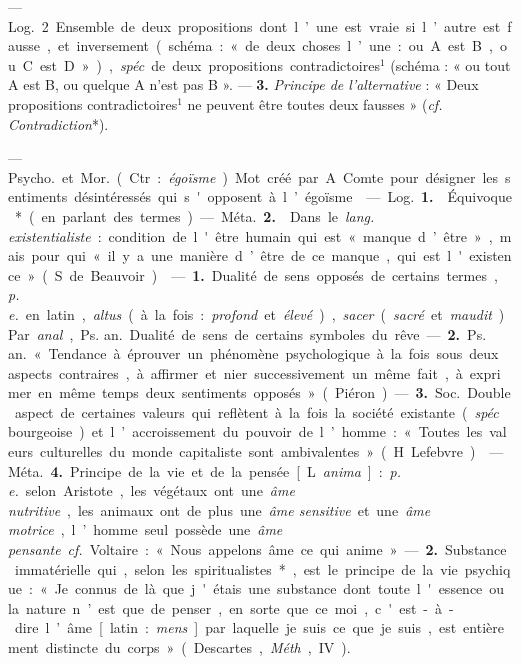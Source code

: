 \begin{itemize}[leftmargin=1cm, label=, itemsep=1pt]
{{— \si{Log.} 2 Ensemble de deux
propositions dont l’une est vraie si
l’autre est fausse, et inversement
(schéma : « de deux choses l’une :
ou A est B, ou C est D »), {\it spéc}. de
deux propositions contradictoires$^1$
(schéma : « ou tout A est B, ou
quelque A n’est pas B »}. — {\bf 3.} {\it Principe de l'alternative} : « Deux propositions contradictoires$^1$ ne peuvent
être toutes deux fausses » ({\it cf.}  {\it Contradiction}*).

 — \si{Psycho.} et \si{Mor.} (Ctr. :
{\it égoïsme}). Mot créé par A. Comte
pour désigner les sentiments désintéressés qui s'opposent à l’égoïsme.

 — \si{Log.} {\bf 1.}  Équivoque* (en
parlant des termes).

— \si{Méta.} {\bf 2.}  Dans le {\it lang. existentialiste} : condition de l'être humain
qui est « manque d’être », mais pour
qui « il y a une manière d’être de
ce manque, qui est l'existence »
(S. de Beauvoir).

 — {\bf 1.} Dualité de sens
opposés de certains termes, {\it p. e.} en
latin, {\it altus} (à la fois : {\it profond} et
{\it élevé}), {\it sacer} ({\it sacré} et {\it maudit}). Par
{\it anal}., \si{Ps. an.} Dualité de sens de
certains symboles du rêve.

— {\bf 2.} \si{Ps. an.} « Tendance à
éprouver un phénomène psychologique à la fois sous deux aspects
contraires, à affirmer et nier successivement un même fait, à exprimer en
même temps deux sentiments opposés » (Piéron.)

— {\bf 3.} \si{Soc.} Double aspect de
certaines valeurs qui reflètent à la
fois la société existante ({\it spéc}. bourgeoise) et l’accroissement du pouvoir
de l’homme : « Toutes les valeurs
culturelles du monde capitaliste sont
ambivalentes » (H. Lefebvre).

 — \si{Méta.} {\bf 4.} Principe de la vie et
de la pensée [L. {\it anima}] : {\it p. e.} selon
Aristote, les végétaux ont une {\it âme
nutritive}, les animaux ont de plus
une {\it âme sensitive} et une {\it âme motrice},
l’homme seul possède une {\it âme pensante}. {\it cf.}  Voltaire : « Nous appelons
âme ce qui anime ». — {\bf 2.} Substance
immatérielle qui, selon les spiritualistes*,
est le principe de la vie psychique : « Je connus de là que j'étais une
substance dont toute l'essence ou la
nature n’est que de penser..., en sorte
que ce moi, c'est-à-dire l’âme [latin :
{\it mens}] par laquelle je suis ce que
je suis, est entièrement distincte du
corps » (Descartes, {\it Méth}., IV).

}
\end{itemize}
